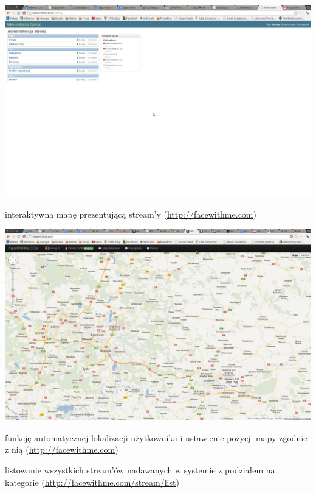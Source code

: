\begin{packed_item}
{\begin{center}
            \includegraphics[width=\textwidth]{img/screens/interfejs_www/panel-administracyjny.jpg}
        \end{center}
    }
    \item{interaktywną mapę prezentującą stream'y (\url{http://facewithme.com})
        \begin{center}
            \includegraphics[width=\textwidth]{img/screens/interfejs_www/interaktywna-mapa.jpg}
        \end{center}
    }
    \item{funkcję automatycznej lokalizacji użytkownika i ustawienie pozycji mapy zgodnie z nią (\url{http://facewithme.com})}
    \item{listowanie wszystkich stream'ów nadawanych w systemie z podziałem na kategorie  (\url{http://facewithme.com/stream/list})
        \begin{center}

\end{center}}
\end{packed_item}
